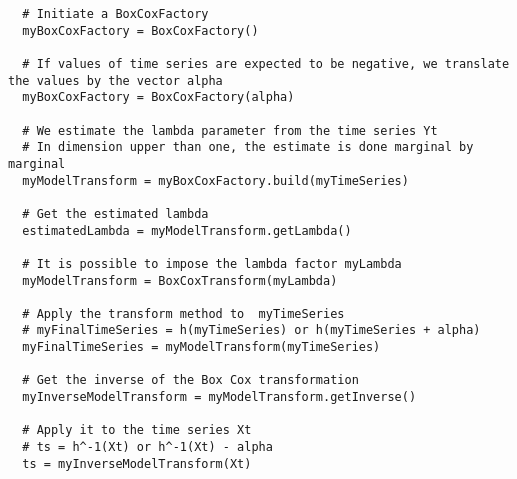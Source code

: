 \begin{lstlisting}
  # Initiate a BoxCoxFactory 
  myBoxCoxFactory = BoxCoxFactory()

  # If values of time series are expected to be negative, we translate the values by the vector alpha
  myBoxCoxFactory = BoxCoxFactory(alpha)

  # We estimate the lambda parameter from the time series Yt
  # In dimension upper than one, the estimate is done marginal by marginal
  myModelTransform = myBoxCoxFactory.build(myTimeSeries) 

  # Get the estimated lambda
  estimatedLambda = myModelTransform.getLambda()
 
  # It is possible to impose the lambda factor myLambda
  myModelTransform = BoxCoxTransform(myLambda)

  # Apply the transform method to  myTimeSeries
  # myFinalTimeSeries = h(myTimeSeries) or h(myTimeSeries + alpha)
  myFinalTimeSeries = myModelTransform(myTimeSeries)

  # Get the inverse of the Box Cox transformation
  myInverseModelTransform = myModelTransform.getInverse()
  
  # Apply it to the time series Xt
  # ts = h^-1(Xt) or h^-1(Xt) - alpha
  ts = myInverseModelTransform(Xt)
\end{lstlisting}

